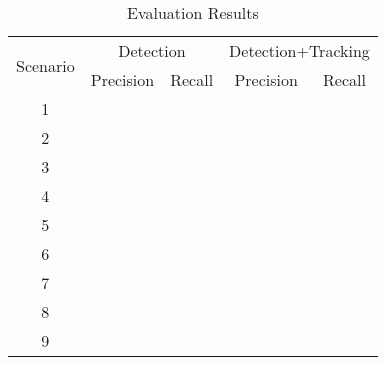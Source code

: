 \begin{table}[!t]
	\centering
	\caption{\footnotesize Evaluation Results}
	\label{Table:Results}
	\renewcommand{\multirowsetup}{\centering}
	\begin{tabular}{c|c|c|c|c}
		\hline
		\multirow{2}[0]{*}{Scenario}  &   \multicolumn{2}{c|}{Detection}    &    \multicolumn{2}{c}{Detection+Tracking}      \\ \cline{2-5}
		 &    Precision      &  Recall   &  Precision & Recall     \\ \hline \hline
		1        &  &    & &            \\ \hline  %
		2        &  &    & &            \\ \hline  %
		3     	 &  &    & &           \\ \hline  %
		4        &  &    & &           \\ \hline  %
		5        &  &    & &           \\ \hline  %
		6        &  &    & &           \\ \hline  %
		7        &  &    & &          \\ \hline  %
		8        &  &    & &          \\ \hline  %
		9        &  &    & &          \\ \hline  %
	\end{tabular}
\end{table}
